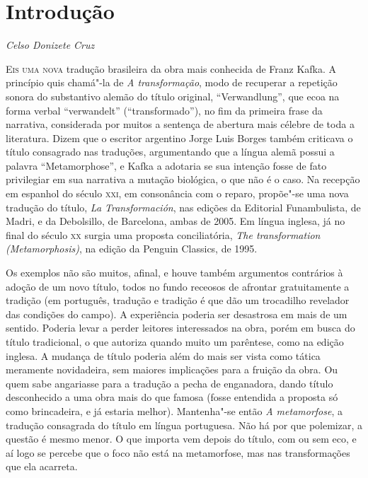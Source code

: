 
\chapter*{Introdução}

\begin{flushright}
\emph{Celso Donizete Cruz}
\end{flushright}


\textsc{Eis uma nova} tradução brasileira da obra mais conhecida de Franz Kafka.
A princípio quis chamá"-la de \textit{A transformação}, modo de
recuperar a repetição sonora do substantivo alemão do título original,
“Verwandlung”, que ecoa na forma verbal “verwandelt” (“transformado”),
no fim da primeira frase da narrativa, considerada por muitos a
sentença de abertura mais célebre de toda a literatura. Dizem que o escritor argentino Jorge Luis Borges também
criticava o título consagrado nas traduções, argumentando que a língua
alemã possui a palavra “Metamorphose”, e Kafka a adotaria se sua
intenção fosse de fato privilegiar em sua narrativa a mutação
biológica, o que não é o caso. Na recepção em espanhol do século \textsc{xxi}, em
consonância com o reparo, propõe"-se uma nova tradução do título,
\textit{La Transformación}, nas edições da Editorial Funambulista, de
Madri, e da Debolsillo, de Barcelona, ambas de 2005. Em língua inglesa,
já no final do século \textsc{xx} surgia uma proposta conciliatória, \textit{The
transformation (Metamorphosis)}, na edição da Penguin Classics, de
1995.

Os exemplos não são muitos, afinal, e houve também argumentos contrários
à adoção de um novo título, todos no fundo receosos de afrontar
gratuitamente a tradição (em português, tradução e tradição é que dão
um trocadilho revelador das condições do campo). A experiência poderia
ser desastrosa em mais de um sentido. Poderia levar a perder leitores
interessados na obra, porém em busca do título tradicional, o que
autoriza quando muito um parêntese, como na edição inglesa. A
mudança de título poderia além do mais ser vista como tática meramente
novidadeira, sem maiores implicações para a fruição da obra. Ou quem
sabe angariasse para a tradução a pecha de enganadora, dando título
desconhecido a uma obra mais do que famosa (fosse entendida a proposta
só como brincadeira, e já estaria melhor). Mantenha"-se então
\textit{A metamorfose}, a tradução consagrada do título em língua
portuguesa. Não há por que polemizar, a questão é mesmo menor. O que
importa vem depois do título, com ou sem eco, e aí logo se percebe que
o foco não está na metamorfose, mas nas transformações que ela
acarreta.

